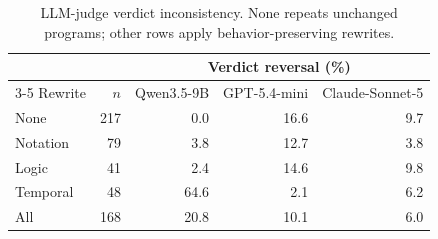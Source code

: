 \begin{table}[t]
\centering
\caption{LLM-judge verdict inconsistency. None repeats unchanged programs; other rows apply behavior-preserving rewrites.}
\label{tab:judge}
\footnotesize
\setlength{\tabcolsep}{3pt}
\begin{tabular}{lr rrr}
\toprule
 & & \multicolumn{3}{c}{Verdict reversal (\%)} \\
\cmidrule(lr){3-5}
Rewrite & $n$ & Qwen3.5-9B & GPT-5.4-mini & Claude-Sonnet-5 \\
\midrule
None & 217 & 0.0 & 16.6 & 9.7 \\
\midrule
Notation & 79 & 3.8 & 12.7 & 3.8 \\
Logic & 41 & 2.4 & 14.6 & 9.8 \\
Temporal & 48 & 64.6 & 2.1 & 6.2 \\
\midrule
All & 168 & 20.8 & 10.1 & 6.0 \\
\bottomrule
\end{tabular}
\end{table}
